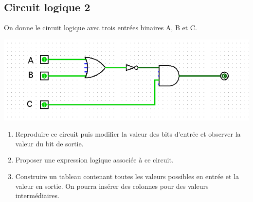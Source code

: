 \documentclass[11pt,a4paper]{article}
\begin{document}
\subsection*{\Large Circuit logique 2}

On donne le circuit logique avec trois entrées binaires A, B et C.

\begin{center}
\includegraphics[scale=0.8]{img/circuit2.png}
\end{center}

\begin{enumerate}
\item Reproduire ce circuit puis modifier la valeur des bits d'entrée et observer la valeur du bit de sortie.

\item Proposer une expression logique associée à ce circuit.

\item Construire un tableau contenant toutes les valeurs possibles en entrée et la valeur en sortie. On pourra insérer des colonnes pour des valeurs intermédiaires. \vspace{5cm}
\end{enumerate}
\end{document}
